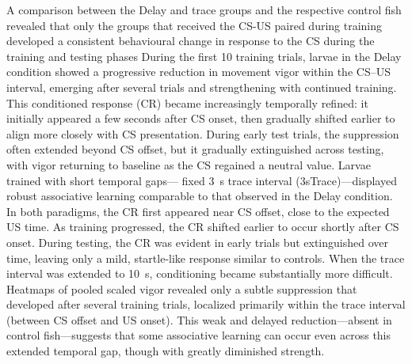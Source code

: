 








A comparison between the Delay and trace groups and the respective control fish revealed that only the groups that received the CS-US paired during training developed a consistent behavioural change in response to the CS during the training and testing phases 
During the first 10 training trials, larvae in the Delay condition showed a progressive reduction in movement vigor within the CS--US interval, emerging after several trials and strengthening with continued training. This conditioned response (CR) became increasingly temporally refined: it initially appeared a few seconds after CS onset, then gradually shifted earlier to align more closely with CS presentation. During early test trials, the suppression often extended beyond CS offset, but it gradually extinguished across testing, with vigor returning to baseline as the CS regained a neutral value.
Larvae trained with short temporal gaps--- fixed \SI{3}{\second} trace interval (3sTrace)---displayed robust associative learning comparable to that observed in the Delay condition. In both paradigms, the CR first appeared near CS offset, close to the expected US time. As training progressed, the CR shifted earlier to occur shortly after CS onset. During testing, the CR was evident in early trials but extinguished over time, leaving only a mild, startle-like response similar to controls.
When the trace interval was extended to \SI{10}{\second}, conditioning became substantially more difficult. Heatmaps of pooled scaled vigor revealed only a subtle suppression that developed after several training trials, localized primarily within the trace interval (between CS offset and US onset). This weak and delayed reduction---absent in control fish---suggests that some associative learning can occur even across this extended temporal gap, though with greatly diminished strength.






